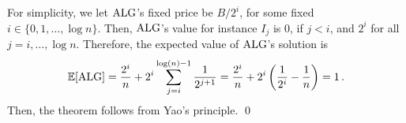 For simplicity, we let $\mathrm{ALG}$'s fixed price be $B/2^i$, for some fixed $i \in \{ 0, 1, \ldots, \log n\}$. Then, $\mathrm{ALG}$'s value for instance $I_j$ is $0$, if $j < i$, and $2^i$ for all $j = i, \ldots, \log n$. Therefore, the expected value of $\mathrm{ALG}$'s solution is 
%
\[ \mathbb{E}[\mathrm{ALG}] = \frac{2^i}{n} + 2^i \sum_{j=i}^{\log(n)-1} \frac{1}{2^{j+1}}
= \frac{2^i}{n} + 2^i \left(\frac{1}{2^i} - \frac{1}{n}\right) = 1\,.
\]
%
Then, the theorem follows from Yao's principle. \qed








